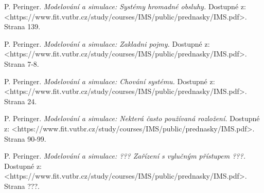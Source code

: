 \documentclass[12pt,a4paper]{article}
\begin{document}
\begin{thebibliography}{99}

 P. Peringer.
\textit{Modelování a simulace: Systémy hromadné obsluhy.}
Dostupné z: \textless https://www.fit.vutbr.cz/study/courses/IMS/public/prednasky/IMS.pdf\textgreater.
Strana 139.

 P. Peringer.
\textit{Modelování a simulace: Zakladni pojmy.}
Dostupné z: \textless https://www.fit.vutbr.cz/study/courses/IMS/public/prednasky/IMS.pdf\textgreater.
Strana 7-8.

 P. Peringer.
\textit{Modelování a simulace: Chování systému.}
Dostupné z: \textless https://www.fit.vutbr.cz/study/courses/IMS/public/prednasky/IMS.pdf\textgreater.
Strana 24.

 P. Peringer.
\textit{Modelování a simulace: Nekterá často používaná rozložení.}
Dostupné z: \textless https://www.fit.vutbr.cz/study/courses/IMS/public/prednasky/IMS.pdf\textgreater.
Strana 90-99.

 P. Peringer.
\textit{Modelování a simulace: ??? Zařízení s vylučným přístupem ???.}
Dostupné z: \textless https://www.fit.vutbr.cz/study/courses/IMS/public/prednasky/IMS.pdf\textgreater.
Strana ???.


\end{thebibliography}
\end{document}
